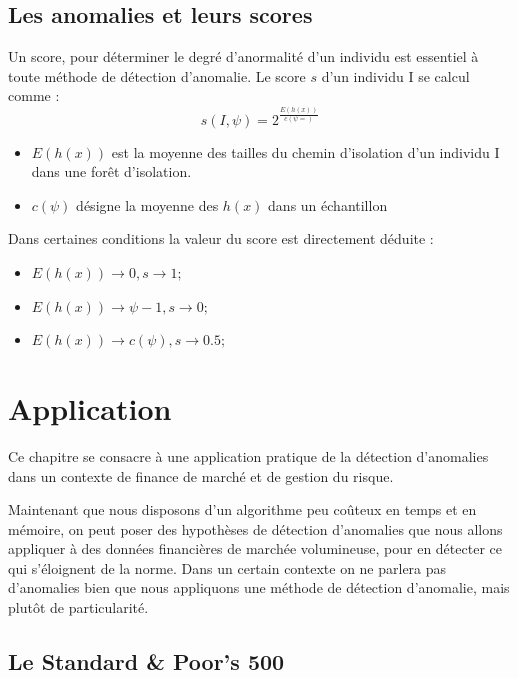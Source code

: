 \section{Les anomalies et leurs scores}

Un score, pour déterminer le degré d'anormalité d'un individu est essentiel à toute méthode de détection d'anomalie.
Le score $s$ d'un individu I se calcul comme :
\begin{equation}
    s(I,\psi)=2^\frac{E(h(x))}{c(\psi=)}
\end{equation}

\begin{itemize}
    \item $E(h(x))$ est la moyenne des tailles du chemin d'isolation d'un individu I dans une forêt d'isolation.
    \item $c(\psi)$ désigne la moyenne des $h(x)$ dans un échantillon
\end{itemize}

Dans certaines conditions la valeur du score est directement déduite :
\begin{itemize}
    \item $E(h(x)) \rightarrow 0,  s \rightarrow 1;$
    \item $E(h(x)) \rightarrow \psi-1,  s \rightarrow 0; $
    \item $E(h(x)) \rightarrow c(\psi),  s \rightarrow 0.5;$
\end{itemize}

\chapter{Application}

Ce chapitre se consacre à une application pratique de la détection d'anomalies dans un contexte de finance de marché et de gestion du risque. 

Maintenant que nous disposons d'un algorithme peu coûteux en temps et en mémoire, on peut poser des hypothèses de détection d'anomalies que nous allons appliquer à des données financières de marchée volumineuse, pour en détecter ce qui s'éloignent de la norme. Dans un certain contexte on ne parlera pas d'anomalies bien que nous appliquons une méthode de détection d'anomalie, mais plutôt de particularité.

\section{Le Standard \& Poor's 500}

